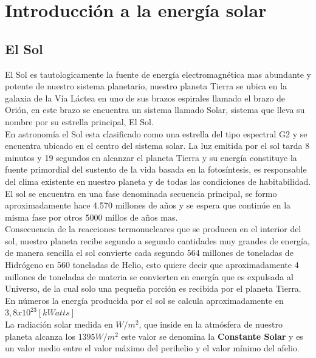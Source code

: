 \chapter{Introducción a la energía solar}
\label{solar}

\section{El Sol}
El Sol es tautologicamente la fuente de energía electromagnética mas abundante y potente de nuestro sistema planetario, nuestro planeta Tierra se ubica en la galaxia de la Vía Láctea en uno de sus brazos espirales llamado el brazo de Orión, en este brazo se encuentra un sistema llamado Solar\cite{solar:1}, sistema que lleva su nombre por su estrella principal, El Sol.\\

En astronomía el Sol esta clasificado como una estrella del tipo espectral G2 y se encuentra ubicado en el centro del sistema solar. La luz emitida por el sol tarda 8 minutos y 19 segundos\cite{solar:2} en alcanzar el planeta Tierra y su energía constituye la fuente primordial del sustento de la vida basada en la fotosíntesis, es responsable del clima existente en nuestro planeta y de todas las condiciones de habitabilidad.\\

El sol se encuentra en una fase denominada secuencia principal, se formo aproximadamente hace 4.570 millones de años y se espera que continúe en la misma fase por otros 5000 millos de años mas.\\
Consecuencia de la reacciones termonucleares que se producen en el interior del sol, nuestro planeta recibe segundo a segundo cantidades muy grandes de energía, de manera sencilla el sol convierte cada segundo 564 millones de toneladas de Hidrógeno en 560 toneladas de Helio, esto quiere decir que aproximadamente 4 millones de toneladas de materia se convierten en energía que es expulsada al Universo, de la cual solo una pequeña porción es recibida por el planeta Tierra. En números la energía producida por el sol se calcula aproximadamente en $3,8 x {10}^{23} [kWatts]$\cite{solar:3}\\

La radiación solar medida en $W/{m}^{2}$, que inside en la atmósfera de nuestro planeta alcanza los $1395 W/{m}^{2}$ este valor se denomina la \textbf{Constante Solar} y es un valor medio entre el valor máximo del perihelio y el valor mínimo del afelio.\\

